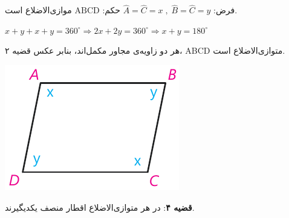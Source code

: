 \documentclass[12pt, a4paper, twoside]{book}
\begin{document}
\begin{minipage}{.68\textwidth}
	\centering فرض: 
	$
		\widehat{A} = \widehat{C} = x \; , \; \widehat{B} = \widehat{C} = y
	$
	\qquad حکم:
	$ 
		\mathrm{ABCD}
	$ موازی‌الاضلاع است.
	\begin{flushleft}
		$ 
			x+y +x +y = 360^{\circ} \Rightarrow 2x + 2y = 360^{\circ} \Rightarrow x+y =180^{\circ}
		$
	\end{flushleft}
		هر دو زاویه‌ی مجاور مکمل‌اند،  بنابر عکس قضیه‌ ۲، ABCD متوازی‌الاضلاع است.
\end{minipage}
\begin{minipage}{.28\textwidth}
	\begin{flushleft}
		\includegraphics{"Shapes/Fasl - 3/Dars 1/qazie 3 ax.pdf"}
	\end{flushleft}
\end{minipage}
\newpage

\textbf{قضیه ۴}: در هر متوازی‌الاضلاع اقطار منصف یکدیگیرند.
\end{document}
